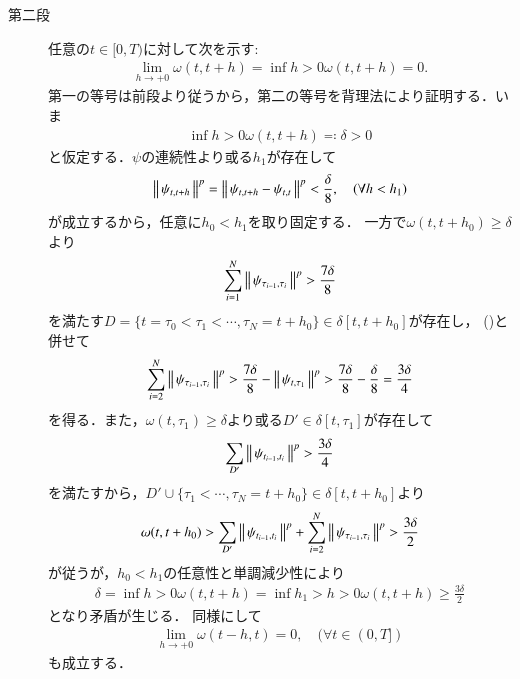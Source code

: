 \begin{prf}
\begin{description}
			\item[第二段]
				任意の$t \in [0,T)$に対して次を示す:
				\begin{align}
					\lim_{h \to +0} \omega(t,t+h) = \inf{h>0}{\omega(t,t+h)} = 0.
				\end{align}
				第一の等号は前段より従うから，第二の等号を背理法により証明する．いま
				\begin{align}
					\inf{h>0}{\omega(t,t+h)} \eqqcolon \delta > 0
					\label{eq:thm_continuity_of_norm_val_p_variation_2}
				\end{align}
				と仮定する．$\psi$の連続性より或る$h_1$が存在して
				\begin{align}
					\left\|\, \psi_{t,t+h}\, \right\|_{}^p
					 = \left\|\, \psi_{t,t+h} - \psi_{t,t}\, \right\|_{}^p
					 < \frac{\delta}{8},
					\quad (\forall h < h_1)
					\label{eq:thm_continuity_of_norm_val_p_variation_1}
				\end{align}
				が成立するから，任意に$h_0 < h_1$を取り固定する．
				一方で$\omega(t,t+h_0) \geq \delta$より
				\begin{align}
					\sum_{i=1}^{N} \left\|\, \psi_{\tau_{i-1},\tau_i}\, \right\|_{}^p > \frac{7\delta}{8}
				\end{align}
				を満たす$D = \{t = \tau_0 < \tau_1 < \cdots, \tau_N = t+h_0\} \in \delta[t,t+h_0]$が存在し，
				()と併せて
				\begin{align}
					\sum_{i=2}^{N} \left\|\, \psi_{\tau_{i-1},\tau_i}\, \right\|_{}^p
					> \frac{7\delta}{8} - \left\|\, \psi_{t,\tau_1}\, \right\|_{}^p
					>\frac{7\delta}{8} - \frac{\delta}{8}
					= \frac{3 \delta}{4}
				\end{align}
				を得る．また，$\omega(t,\tau_1) \geq \delta$より或る$D' \in \delta[t,\tau_1]$が存在して
				\begin{align}
					\sum_{D'} \left\|\, \psi_{t_{i-1},t_i}\, \right\|_{}^p > \frac{3 \delta}{4}
				\end{align}
				を満たすから，$D' \cup \{\tau_1 < \cdots, \tau_N = t+h_0\} \in \delta[t,t+h_0]$より
				\begin{align}
					\omega(t,t+h_0) > \sum_{D'} \left\|\, \psi_{t_{i-1},t_i}\, \right\|_{}^p + \sum_{i=2}^{N} \left\|\, \psi_{\tau_{i-1},\tau_i}\, \right\|_{}^p
					> \frac{3\delta}{2}
				\end{align}
				が従うが，$h_0 < h_1$の任意性と単調減少性により
				\begin{align}
					\delta = \inf{h>0}{\omega(t,t+h)} = \inf{h_1>h>0}{\omega(t,t+h)} \geq \frac{3\delta}{2}
				\end{align}
				となり矛盾が生じる．
				同様にして
				\begin{align}
					\lim_{h \to +0} \omega(t-h,t) = 0,
					\quad (\forall t \in (0,T])
				\end{align}
				も成立する．
				

\end{description}
\end{prf}
